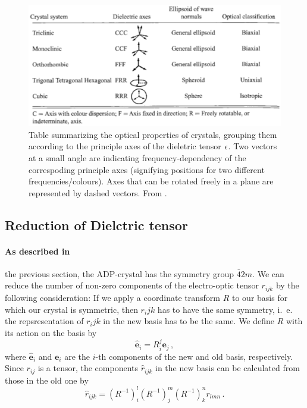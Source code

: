 \begin{figure}
\includegraphics[width=\pltw]{figures/crystal_ellipsoid.pdf}
\caption{
    Table summarizing the optical properties of crystals, grouping them 
    according to the principle axes of the dieletric tensor $\epsilon$. 
    Two vectors at a small angle are indicating frequency-dependency 
    of the correspoding principle axes (signifying positions for two different 
    frequencies/colours). Axes that can be rotated freely in a plane are represented 
    by dashed vectors. 
    From \cite{born1999principles}. }
\label{fig:crystal_ellipsoid}
\end{figure}


\subsection{Reduction of Dielctric tensor}
\label{sec:reduce}
\paragraph{As described in} 
the previous section, the ADP-crystal has the symmetry group 
$\bar{4}2m$. We can reduce the number of non-zero components of the 
electro-optic tensor $r_{ijk}$ by the following consideration:
If we apply a coordinate transform $R$ to our basis for which 
our crystal is symmetric, then $r_ijk$ has to have the same symmetry, 
i.~e. the repsresentation of $r_ijk$ in the new basis has to be the same.
We define $R$ with its action on the basis by 
\begin{equation}
    \mathbf{\hat{e}}_i = R_i^j \mathbf{e}_j \, ,
\end{equation}
where $\mathbf{\hat{e}}_i$ and $\mathbf{e}_i$ are 
the $i$-th components of the new and old basis, respectively. 
Since $r_{ij}$ is a tensor, the components $\hat{r}_{ijk}$ in the 
new basis can be calculated from those in the old one by 
\begin{equation}
    \hat{r}_{ijk} = 
        \left( R^{-1}\right)_i^l
        \left( R^{-1}\right)_j^m
        \left( R^{-1}\right)_k^n
        r_{lmn} \, .
\end{equation}


